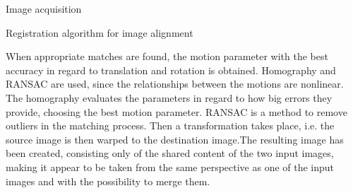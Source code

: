 \documentclass[10pt]{article}
\begin{document}
\begin{section}{Image acquisition}
\begin{subsection}{Registration algorithm for image alignment}
        \medskip

        When appropriate matches are found, the motion parameter with the best accuracy in regard to translation and rotation is obtained. Homography and RANSAC are used, since the relationships between the motions are nonlinear. The homography evaluates the parameters in regard to how big errors they provide, choosing the best motion parameter. RANSAC is a method to remove outliers in the matching process. Then a transformation takes place, i.e. the source image is then warped to the destination image.The resulting image has been created, consisting only of the shared content of the two input images, making it appear to be taken from the same perspective as one of the input images and with the possibility to merge them.

    \end{subsection} %
\end{section}
\end{document}
